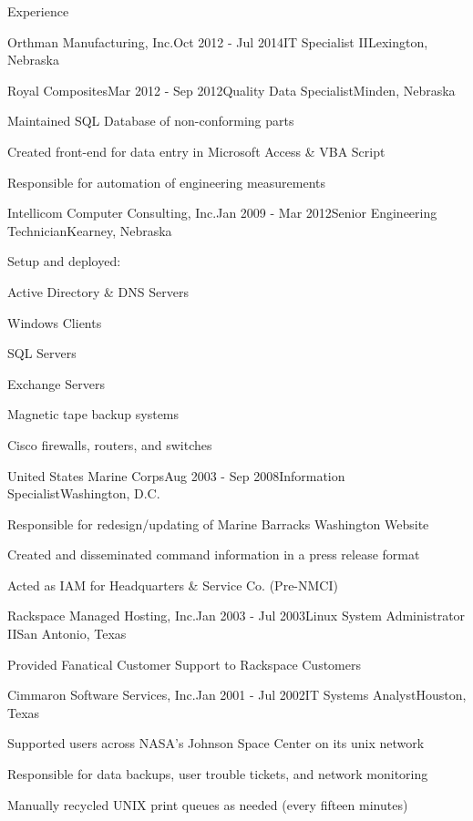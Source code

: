 \documentclass{resume} %
\begin{document}
\begin{rSection}{Experience}
\begin{rSubsection}{Orthman Manufacturing, Inc.}{Oct 2012 - Jul 2014}{IT Specialist II}{Lexington, Nebraska}
\end{rSubsection}

\begin{rSubsection}{Royal Composites}{Mar 2012 - Sep 2012}{Quality Data Specialist}{Minden, Nebraska}
\item Maintained SQL Database of non-conforming parts
\item Created front-end for data entry in Microsoft Access \& VBA Script
\item Responsible for automation of engineering measurements
\end{rSubsection}

\begin{rSubsection}{Intellicom Computer Consulting, Inc.}{Jan 2009 - Mar 2012}{Senior Engineering Technician}{Kearney, Nebraska}
\item Setup and deployed:
\item Active Directory \& DNS Servers
\item Windows Clients
\item SQL Servers
\item Exchange Servers
\item Magnetic tape backup systems
\item Cisco firewalls, routers, and switches
\end{rSubsection}

\begin{rSubsection}{United States Marine Corps}{Aug 2003 - Sep 2008}{Information Specialist}{Washington, D.C.}
\item Responsible for redesign/updating of Marine Barracks Washington Website
\item Created and disseminated command information in a press release format
\item Acted as IAM for Headquarters \& Service Co. (Pre-NMCI)
\end{rSubsection}

\begin{rSubsection}{Rackspace Managed Hosting, Inc.}{Jan 2003 - Jul 2003}{Linux System Administrator II}{San Antonio, Texas}
\item Provided Fanatical Customer Support to Rackspace Customers
\end{rSubsection}

\begin{rSubsection}{Cimmaron Software Services, Inc.}{Jan 2001 - Jul 2002}{IT Systems Analyst}{Houston, Texas}
\item Supported users across NASA's Johnson Space Center on its unix network
\item Responsible for data backups, user trouble tickets, and network monitoring
\item Manually recycled UNIX print queues as needed (every fifteen minutes)
\end{rSubsection}


\end{rSection}
\end{document}
